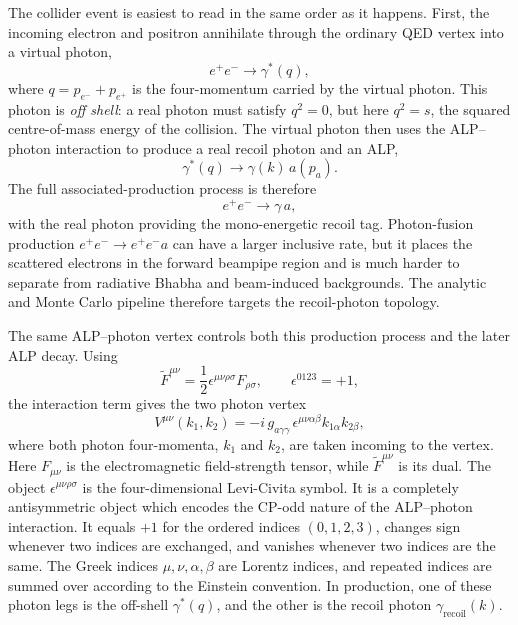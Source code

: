 \documentclass[12pt,a4paper]{article}
\newcommand{\alp}{a}
\newcommand{\gagg}{g_{a\gamma\gamma}}
\begin{document}
The collider event is easiest to read in the same order as it happens. First,
the incoming electron and positron annihilate through the ordinary QED vertex
into a virtual photon,
\begin{equation}
    e^+e^- \to \gamma^\ast(q),
\end{equation}
where $q=p_{e^-}+p_{e^+}$ is the four-momentum carried by the virtual photon.
This photon is \emph{off shell}: a real photon must satisfy $q^2=0$, but here
$q^2=s$, the squared centre-of-mass energy of the collision. The virtual
photon then uses the ALP--photon interaction to produce a real recoil photon
and an ALP,
\begin{equation}
    \gamma^\ast(q)\to \gamma(k)\,a(p_a).
\end{equation}
The full associated-production process is therefore
\begin{equation}
    e^+ e^- \to \gamma\,\alp,
    \label{eq:production}
\end{equation}
with the real photon providing the mono-energetic recoil tag.
Photon-fusion production
$e^+e^-\to e^+e^-a$ can have a larger inclusive rate, but it places the
scattered electrons in the forward beampipe region and is much harder to
separate from radiative Bhabha and beam-induced backgrounds. The analytic and
Monte Carlo pipeline therefore targets the recoil-photon topology.

The same ALP--photon vertex controls both this production process and the later
ALP decay. Using
\begin{equation}
    \tilde F^{\mu\nu}
    = \frac{1}{2}\epsilon^{\mu\nu\rho\sigma}F_{\rho\sigma},
    \qquad
    \epsilon^{0123}=+1,
\end{equation}
the interaction term gives the two photon vertex
\begin{equation}
    V^{\mu\nu}(k_1,k_2)
    =
    -i\,\gagg\,
    \epsilon^{\mu\nu\alpha\beta}k_{1\alpha}k_{2\beta},
    \label{eq:vertex}
\end{equation}
where both photon four-momenta, $k_1$ and $k_2$, are taken incoming to the
vertex. Here $F_{\mu\nu}$ is the electromagnetic field-strength tensor, while
$\tilde F^{\mu\nu}$ is its dual. The object
$\epsilon^{\mu\nu\rho\sigma}$ is the four-dimensional Levi-Civita symbol. It is
a completely antisymmetric object which encodes the CP-odd nature of the
ALP--photon interaction. It equals $+1$ for the ordered indices $(0,1,2,3)$,
changes sign whenever two indices are exchanged, and vanishes whenever two
indices are the same. The Greek indices $\mu,\nu,\alpha,\beta$ are Lorentz
indices, and repeated indices are summed over according to the Einstein
convention. In production, one of these photon legs is the off-shell
$\gamma^\ast(q)$, and the other is the recoil photon
$\gamma_\mathrm{recoil}(k)$.
\end{document}
